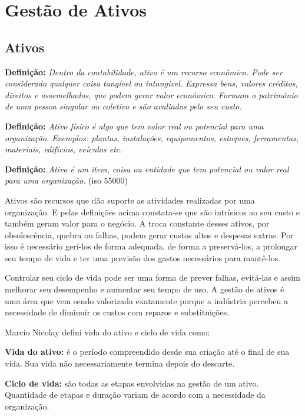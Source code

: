\chapter{Gestão de Ativos}
\label{cap-ativos}

\section{Ativos}

\textbf{Definição:} \emph{Dentro da contabilidade, ativo é um recurso econômico. Pode ser considerado qualquer coisa tangível ou intangível. Expressa bens, valores créditos, direitos e assemelhados, que podem gerar valor econômico. Formam o patrimônio de uma pessoa singular ou coletiva e são avaliados pelo seu custo.} \cite{sullivan2003}\cite{fulgencio2007} 

\textbf{Definição:} \emph{Ativo físico é algo que tem valor real ou potencial para uma organização.
Exemplos: plantas, instalações, equipamentos, estoques, ferramentas, materiais, edifícios, veículos etc.} \cite{nicolay2015}

\textbf{Definição:} \emph{Ativo é um item, coisa ou entidade que tem potencial ou valor real para uma organização.} (iso 55000)

Ativos são recursos que dão suporte as atividades realizadas por uma organização. E pelas definições acima constata-se que são intrísicos ao seu custo e também geram valor para o negócio. A troca constante desses ativos, por obsolescência, quebra ou falhas, podem gerar custos altos e despesas extras. Por isso é necessário gerí-los de forma adequada, de forma a preservá-los, a prolongar seu tempo de vida e ter uma previsão dos gastos necessários para mantê-los. 

Controlar seu ciclo de vida pode ser uma forma de prever falhas, evitá-las e assim melhorar seu desempenho e aumentar seu tempo de uso. A gestão de ativos é uma área que vem sendo valorizada exatamente porque a indústria percebeu a necessidade de diminuir os custos com reparos e substituições.

Marcio Nicolay \cite{nicolay2015} defini vida do ativo e ciclo de vida como:

\textbf{Vida do ativo:} é o período compreendido desde sua criação até o final de sua vida. Sua vida não necessariamente termina depois do descarte.

\textbf{Ciclo de vida:} são todas as etapas envolvidas na gestão de um ativo. Quantidade de etapas e duração variam de acordo com a necessidade da organização.

